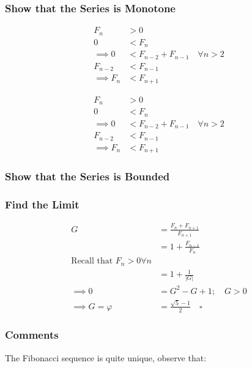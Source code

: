 \documentclass[11pt]{article}
\begin{document}
\subsubsection{Show that the Series is Monotone}
\label{sec:org2528a11}
$$\begin{aligned}
F_{n} &> 0 \\
0 &< F_{n} \\
 \implies   0 &< F_{n - 2} +  F_{n- 1} \quad \forall n > 2 \\
  F_{n- 2} &< F_{n- 1}  \\
   \implies  F_n & < F_{n+1}
\end{aligned}$$

$$\begin{aligned}
F_{n} &> 0 \\
0 &< F_{n} \\
 \implies   0 &< F_{n - 2} +  F_{n- 1} \quad \forall n > 2 \\
  F_{n- 2} &< F_{n- 1}  \\
   \implies  F_n & < F_{n+1}
\end{aligned}$$



\subsubsection{Show that the Series is Bounded}
\label{sec:orgc8f7e2c}
\subsubsection{Find the Limit}
\label{sec:org2640962}
$$\begin{aligned}
G &= \frac{F_{n} +  F_{n+  1} }{F_{n+  1} } \\
&= 1 +  \frac{F_{n- 1} }{F_n} \\
\text{Recall that $F_n > 0 \forall n$}\\
&=  1 +  \frac{1}{    \left\lvert G \right\rvert } \\
 \implies  0 &= G^2- G +  1; \quad G > 0  \\
  \implies  G = \varphi &=  \frac{\sqrt{5} - 1  }{2} \quad  \square
\end{aligned}$$


\subsubsection{Comments}
\label{sec:orgc6a1d24}

The Fibonacci sequence is quite unique, observe that:
\end{document}
